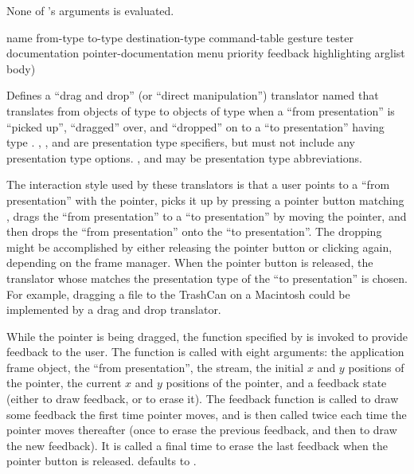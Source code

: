 None of 's arguments is evaluated.


 {name
                                             from-type to-type destination-type command-table 
                                             \key gesture tester
                                                  documentation pointer-documentation
                                                  menu priority
                                                  feedback highlighting}
                                             arglist
                                             \body body)

Defines a ``drag and drop'' (or ``direct manipulation'') translator named
 that translates from objects of type  to objects of
type  when a ``from presentation'' is ``picked up'', ``dragged''
over, and ``dropped'' on to a ``to presentation'' having type
.  , , and
 are presentation type specifiers, but must not include
any presentation type options.  ,  and
 may be presentation type abbreviations.

The interaction style used by these translators is that a user points to a
``from presentation'' with the pointer, picks it up by pressing a pointer button
matching , drags the ``from presentation'' to a ``to presentation''
by moving the pointer, and then drops the ``from presentation'' onto the ``to
presentation''.  The dropping might be accomplished by either releasing the
pointer button or clicking again, depending on the frame manager.  When the
pointer button is released, the translator whose  matches
the presentation type of the ``to presentation'' is chosen.  For example,
dragging a file to the TrashCan on a Macintosh could be implemented by a drag
and drop translator.

While the pointer is being dragged, the function specified by  is
invoked to provide feedback to the user.  The function is called with eight
arguments: the application frame object, the ``from presentation'', the stream,
the initial $x$ and $y$ positions of the pointer, the current $x$ and $y$
positions of the pointer, and a feedback state (either  to draw
feedback, or  to erase it).  The feedback function is called to
draw some feedback the first time pointer moves, and is then called twice each
time the pointer moves thereafter (once to erase the previous feedback, and then
to draw the new feedback).  It is called a final time to erase the last feedback
when the pointer button is released.   defaults to
.

